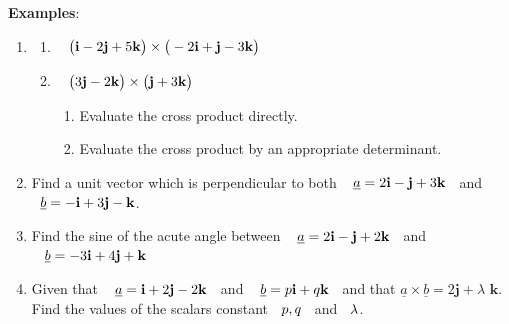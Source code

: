 \documentclass[11pt,a4paper]{article}
\begin{document}
\textbf{Examples}:
\begin{enumerate}
\item 
\begin{enumerate}
      \item $\hspace{0.3cm} \big(\textbf{i} - 2\textbf{j} + 5\textbf{k}\big)\times \big(-2\textbf{i} + \textbf{j} - 3\textbf{k}\big)$
      
      \item $\hspace{0.3cm} \big(3\textbf{j} - 2\textbf{k}\big) \times \big(\textbf{j} + 3\textbf{k}\big)$
\begin{enumerate}
            \item Evaluate the cross product directly.
            \item Evaluate the cross product by an appropriate determinant.
\end{enumerate}
\end{enumerate}


\item Find a unit vector which is perpendicular to both $\hspace{0.3cm} \underline{a} = 2\textbf{i} - \textbf{j} + 3\textbf{k}\hspace{0.2cm}$ and\\ $\hspace{0.2cm} \underline{b} = -\textbf{i} + 3\textbf{j} - \textbf{k}$.

\item Find the sine of the acute angle between $\hspace{0.3cm} \underline{a} = 2\textbf{i} - \textbf{j} + 2\textbf{k}\hspace{0.2cm}$ and $\hspace{0.3cm} \underline{b} = -3\textbf{i} +  4\textbf{j} + \textbf{k}\hspace{0.2cm}$

\item Given that  $\hspace{0.3cm} \underline{a} = \textbf{i} + 2 \textbf{j} - 2\textbf{k}\hspace{0.2cm}$ and $\hspace{0.3cm} \underline{b} = p\textbf{i}  + q\textbf{k}\hspace{0.2cm}$ and that $\underline{a}\times \underline{b} = 2\textbf{j} + \lambda \textbf{ k}$. Find the values of the scalars constant $\hspace{0.2cm} p, q\hspace{0.2cm}$ and $\hspace{0.2cm} \lambda$.


\end{enumerate}
\end{document}
